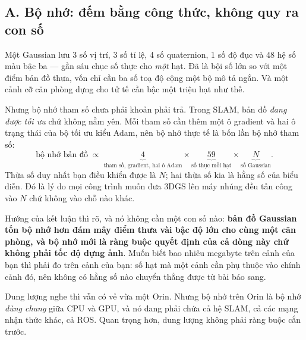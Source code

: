 \documentclass[../../deep_learning.tex]{subfiles}
\begin{document}
\subsection{A. Bộ nhớ: đếm bằng công thức, không quy ra con số}
Một Gaussian lưu 3 số vị trí, 3 số tỉ lệ, 4 số quaternion, 1 số độ đục và 48 hệ số màu bậc ba --- gần sáu chục số thực cho \emph{một} hạt. Đã là bội số lớn so với một điểm bản đồ thưa, vốn chỉ cần ba số toạ độ cộng một bộ mô tả ngắn. Và một cảnh cỡ căn phòng dựng cho tử tế cần bậc một triệu hạt như thế.

Nhưng bộ nhớ tham số chưa phải khoản phải trả. Trong SLAM, bản đồ \emph{đang được tối ưu} chứ không nằm yên. Mỗi tham số cần thêm một ô gradient và hai ô trạng thái của bộ tối ưu kiểu Adam, nên bộ nhớ thực tế là bốn lần bộ nhớ tham số:
\[
\text{bộ nhớ bản đồ} \;\propto\; \underbrace{4}_{\text{tham số, gradient, hai ô Adam}} \times \underbrace{59}_{\text{số thực mỗi hạt}} \times \underbrace{N}_{\text{số Gaussian}} .
\]
Thừa số duy nhất bạn điều khiển được là \(N\); hai thừa số kia là hằng số của biểu diễn. Đó là lý do mọi công trình muốn đưa 3DGS lên máy nhúng đều tấn công vào \(N\) chứ không vào chỗ nào khác.

Hướng của kết luận thì rõ, và nó không cần một con số nào: \textbf{bản đồ Gaussian tốn bộ nhớ hơn đám mây điểm thưa vài bậc độ lớn cho cùng một căn phòng, và bộ nhớ mới là ràng buộc quyết định của cả dòng này chứ không phải tốc độ dựng ảnh}. Muốn biết bao nhiêu megabyte trên cảnh của bạn thì phải đo trên cảnh của bạn: số hạt mà một cảnh cần phụ thuộc vào chính cảnh đó, nên không có hằng số nào chuyển thẳng được từ bài báo sang.

Dung lượng nghe thì vẫn có vẻ vừa một Orin. Nhưng bộ nhớ trên Orin là bộ nhớ \emph{dùng chung} giữa CPU và GPU, và nó đang phải chứa cả hệ SLAM, cả các mạng nhận thức khác, cả ROS. Quan trọng hơn, dung lượng không phải ràng buộc cắn trước.
\end{document}
